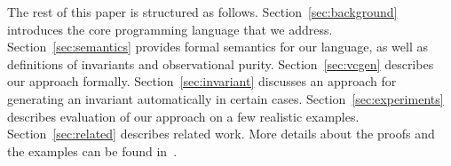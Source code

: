 
The rest of this paper is structured as
follows. Section~\ref{sec:background} introduces the core programming
language that we address. Section~\ref{sec:semantics} provides formal
semantics for our language, as well as definitions of invariants and
observational purity. Section~\ref{sec:vcgen} describes our approach
formally. Section~\ref{sec:invariant} discusses an approach for generating
an invariant automatically in certain cases. Section~\ref{sec:experiments}  describes evaluation of our approach on a few realistic examples.
Section~\ref{sec:related} describes related work.
More details about the proofs and the examples can be found in~\cite{CheckingOP:arxiv}.

